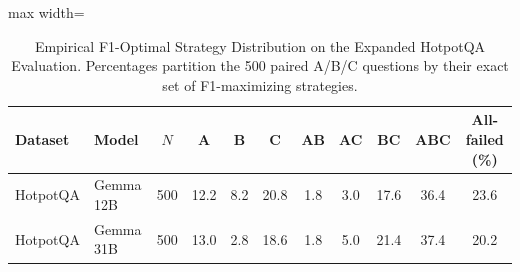 \begin{table}[H]
\centering
\begingroup
\renewcommand{\thetable}{2a}
\caption{Empirical F1-Optimal Strategy Distribution on the Expanded HotpotQA Evaluation. Percentages partition the 500 paired A/B/C questions by their exact set of F1-maximizing strategies.}
\label{tab:label-validity}
\label{tab:label-validity-distribution}
\endgroup
\small
\setlength{\tabcolsep}{5pt}
\begin{adjustbox}{max width=\textwidth}
\begin{tabular}{@{}llccccccccc@{}}
\toprule
Dataset & Model & $N$ & A & B & C & AB & AC & BC & ABC & All-failed (\%) \tabularnewline
\midrule
HotpotQA & Gemma 12B & 500 & 12.2 & 8.2 & 20.8 & 1.8 & 3.0 & 17.6 & 36.4 & 23.6 \tabularnewline
HotpotQA & Gemma 31B & 500 & 13.0 & 2.8 & 18.6 & 1.8 & 5.0 & 21.4 & 37.4 & 20.2 \tabularnewline
\bottomrule
\end{tabular}
\end{adjustbox}
\end{table}

